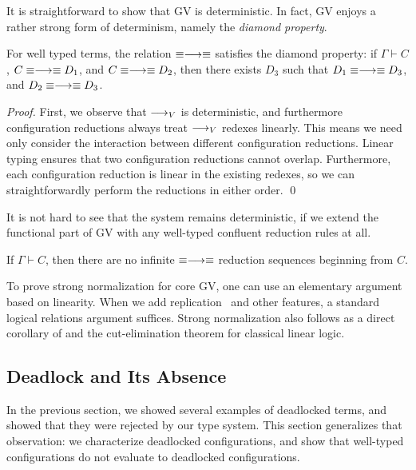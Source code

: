 \documentclass[oribibl,orivec,envcountsame]{llncs}
\begin{document}
It is straightforward to show that GV is deterministic. In fact, GV enjoys a rather strong form of
determinism, namely the \emph{diamond property}.
\begin{theorem}
For well typed terms, the relation $\equiv\longrightarrow\equiv$ satisfies the diamond property: if $\Gamma
\vdash C$, $C \equiv\longrightarrow\equiv D_1$, and $C \equiv\longrightarrow\equiv D_2$, then there exists $D_3$ such
that $D_1 \equiv\longrightarrow\equiv D_3$, and $D_2 \equiv\longrightarrow\equiv D_3$.
\end{theorem}
\begin{proof}
First, we observe that $\longrightarrow_V$ is deterministic, and furthermore configuration reductions always
treat $\longrightarrow_V$ redexes linearly. This means we need only consider the interaction between different
configuration reductions.
%
Linear typing ensures that two configuration reductions cannot overlap. Furthermore, each
configuration reduction is linear in the existing redexes, so we can straightforwardly perform the
reductions in either order. \qed
\end{proof}
%
It is not hard to see that the system remains deterministic, if we extend the functional part of GV
with any well-typed confluent reduction rules at all.

\begin{theorem}
  If $\Gamma \vdash C$, then there are no infinite $\equiv\longrightarrow\equiv$ reduction sequences
  beginning from $C$.
\end{theorem}
To prove strong normalization for core GV, one can use an elementary argument based on
linearity. When we add replication~ and other features, a standard logical relations
argument suffices. Strong normalization also follows as a direct corollary of
 and the cut-elimination theorem for classical linear logic.

\subsection{Deadlock and Its Absence}\label{sec:gv-deadlock}
\newcommand{\blockedp}{\mathsf{blocked}}
\newcommand{\depp}{\mathsf{depends}}
\newcommand{\deadlockp}{\ensuremath{\mathsf{deadlocked}}}

In the previous section, we showed several examples of deadlocked terms, and showed that they were
rejected by our type system.  This section generalizes that observation: we characterize deadlocked
configurations, and show that well-typed configurations do not evaluate to deadlocked
configurations.
\end{document}
